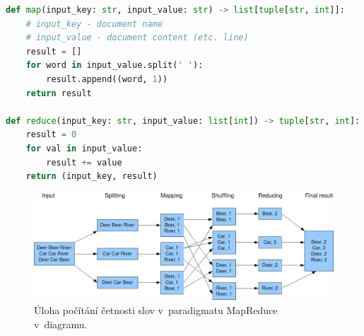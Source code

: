 \bigskip\noindent\begin{minipage}{\linewidth}
\begin{lstlisting}[language=Python, caption={Příklad implementace funkcí \textit{map} a \textit{reduce} v~paradigmatu MapReduce pro počítání četnosti slov ve vstupu v~Pythonu.}]
def map(input_key: str, input_value: str) -> list[tuple[str, int]]:
    # input_key - document name
    # input_value - document content (etc. line)
    result = []
    for word in input_value.split(' '):
        result.append((word, 1))
    return result

def reduce(input_key: str, input_value: list[int]) -> tuple[str, int]:
    result = 0
    for val in input_value:
        result += value
    return (input_key, result)
\end{lstlisting}
\end{minipage}

\begin{figure}[H]
    \centering
    \includegraphics[width=1\linewidth]{map_reduce_example.png}
    \caption{Úloha počítání četnosti slov v~paradigmatu MapReduce v~diagramu.}
    \label{49_map_reduce_example}
\end{figure}

